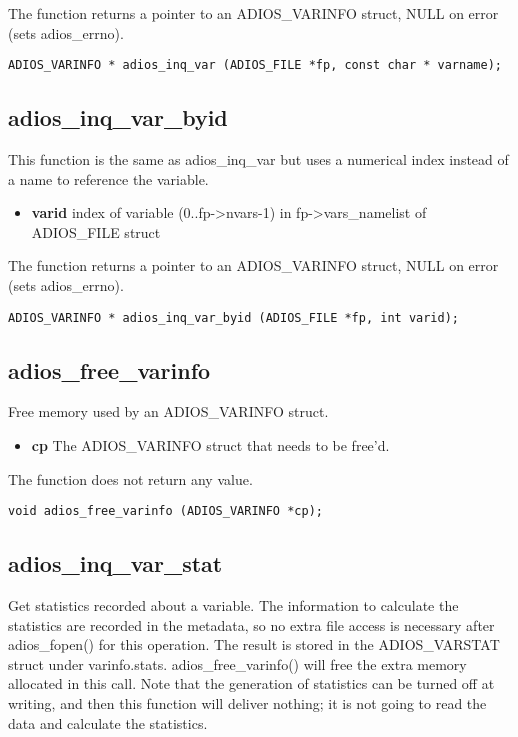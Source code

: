 \noindent The function returns a pointer to an ADIOS\_VARINFO struct, NULL on error (sets adios\_errno).

\begin{lstlisting}[alsolanguage=C]
ADIOS_VARINFO * adios_inq_var (ADIOS_FILE *fp, const char * varname);

\end{lstlisting}

\subsection{adios\_inq\_var\_byid}
This function is the same as adios\_inq\_var but uses a numerical index instead of a name to reference the variable. 

\begin{itemize}
\item{\bf varid}    index of variable (0..fp->nvars-1)
in fp->vars\_namelist of ADIOS\_FILE struct
\end{itemize}

\noindent The function returns a pointer to an  ADIOS\_VARINFO struct, NULL on error (sets adios\_errno).

\begin{lstlisting}[alsolanguage=C]
ADIOS_VARINFO * adios_inq_var_byid (ADIOS_FILE *fp, int varid);
\end{lstlisting}

\subsection{adios\_free\_varinfo}
Free memory used by an ADIOS\_VARINFO struct. 
\begin{itemize}
\item{\bf cp} The ADIOS\_VARINFO struct that needs to be free'd. 
\end{itemize}

\noindent The function does not return any value.

\begin{lstlisting}[alsolanguage=C]
void adios_free_varinfo (ADIOS_VARINFO *cp);
\end{lstlisting}

\subsection{adios\_inq\_var\_stat}
Get statistics recorded about a variable. The information to calculate the statistics are recorded in the metadata,
so no extra file access is necessary after adios\_fopen() for this operation.
The result is stored in the ADIOS\_VARSTAT struct under varinfo.stats. 
adios\_free\_varinfo() will free the extra memory allocated in this call. 
Note that the generation of statistics can be turned off at writing, and then this function will deliver 
nothing; it is not going to read the data and calculate the statistics. 

